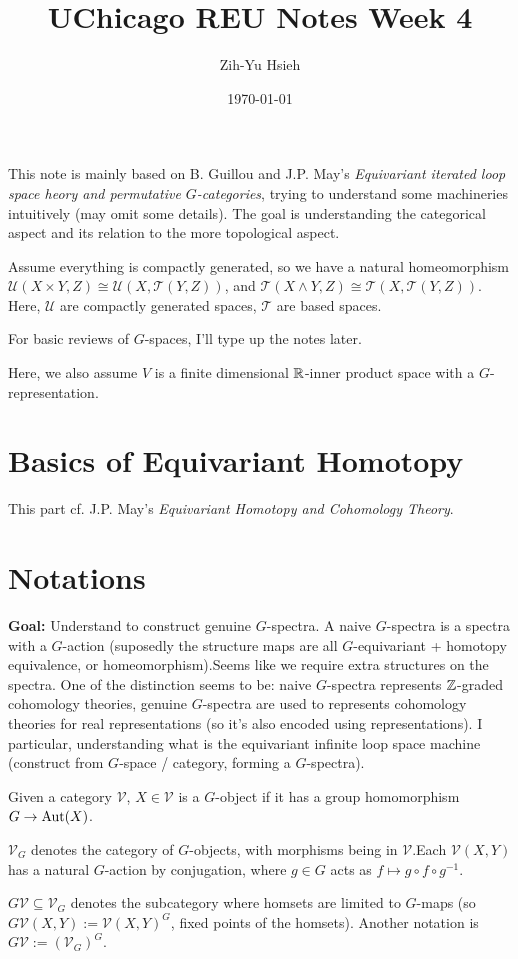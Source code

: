 \documentclass{article}
\title{UChicago REU Notes Week 4}
\author{Zih-Yu Hsieh}
\date{\today}
\begin{document}
\maketitle
\tableofcontents

This note is mainly based on B. Guillou and J.P. May's \emph{Equivariant iterated loop space heory and permutative $G$-categories}, trying to understand some machineries intuitively (may omit some details). The goal is understanding the categorical aspect and its relation to the more topological aspect.

\begin{rem}
Assume everything is compactly generated, so we have a natural homeomorphism $\mathcal{U}(X\times Y,Z)\cong \mathcal{U}(X,\mathcal{T}(Y,Z))$, and $\mathcal{T}(X\wedge Y,Z)\cong \mathcal{T}(X,\mathcal{T}(Y,Z))$. Here, $\mathcal{U}$ are compactly generated spaces, $\mathcal{T}$ are based spaces.

For basic reviews of $G$-spaces, I'll type up the notes later.

Here, we also assume $V$ is a finite dimensional $\mathbb{R}$-inner product space with a $G$-representation.
\end{rem}

\section{Basics of Equivariant Homotopy}

This part cf. J.P. May's \emph{Equivariant Homotopy and Cohomology Theory}.


\section{Notations}

\textbf{Goal:} Understand to construct genuine $G$-spectra. A naive $G$-spectra is a spectra with a $G$-action (suposedly the structure maps are all $G$-equivariant + homotopy equivalence, or homeomorphism).Seems like we require extra structures on the spectra. One of the distinction seems to be: naive $G$-spectra represents $\mathbb{Z}$-graded cohomology theories, genuine $G$-spectra are used to represents cohomology theories for real representations (so it's also encoded using representations). I particular, understanding what is the equivariant infinite loop space machine (construct from $G$-space / category, forming a $G$-spectra).

\hfil

\begin{defn}
Given a category $\mathcal{V}$, $X\in\mathcal{V}$ is a $G$-object if it has a group homomorphism $G\rightarrow \mathrm{Aut}(X)$. 

$\mathcal{V}_G$ denotes the category of $G$-objects, with morphisms being in $\mathcal{V}$.Each $\mathcal{V}(X,Y)$ has a natural $G$-action by conjugation, where $g\in G$ acts as $f\mapsto g\circ f\circ g^{-1}$.

$G\mathcal{V} \subseteq \mathcal{V}_G$ denotes the subcategory where homsets are limited to $G$-maps (so $G\mathcal{V}(X,Y):= \mathcal{V}(X,Y)^G$, fixed points of the homsets). Another notation is $G\mathcal{V}:= (\mathcal{V}_G)^G$.
\end{defn}
\end{document}
